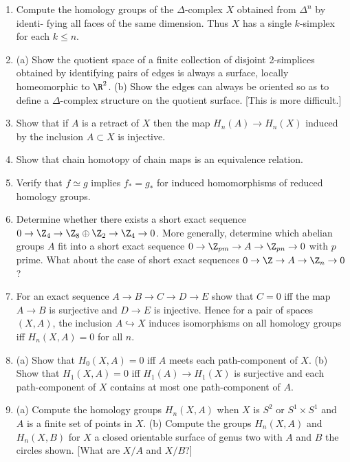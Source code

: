 \begin{enumerate}
\item Compute the homology groups of the $\Delta$-complex $X$ obtained from $\Delta^n$ by identi-
fying all faces of the same dimension. Thus $X$ has a single $k$-simplex for each $k \le n$.

\item (a) Show the quotient space of a finite collection of disjoint 2-simplices obtained
by identifying pairs of edges is always a surface, locally homeomorphic to $\R^2$.
(b) Show the edges can always be oriented so as to define a $\Delta$-complex structure on
the quotient surface. [This is more difficult.]

\item Show that if $A$ is a retract of $X$ then the map $H_n(A) \to H_n(X)$ induced by the
inclusion $A \subset X$ is injective.

\item Show that chain homotopy of chain maps is an equivalence relation.

\item Verify that $f \simeq g$ implies $f_* = g_*$ for induced homomorphisms of reduced
homology groups.

\item Determine whether there exists a short exact sequence $0 \to \Z_4 \to \Z_8 \oplus \Z_2 \to \Z_4 \to 0$.
More generally, determine which abelian groups $A$ fit into a short exact sequence
$0 \to \Z_{pm} \to A \to \Z_{pn} \to 0$ with $p$ prime. What about the case of short exact sequences
$0 \to \Z \to A \to \Z_n \to 0$?

\item For an exact sequence $A \to B \to C \to D \to E$ show that $C = 0$ iff the map $A \to B$
is surjective and $D \to E$ is injective. Hence for a pair of spaces $(X, A)$, the inclusion
$A \hookrightarrow X$ induces isomorphisms on all homology groups iff $H_n(X, A) = 0$ for all $n$.

\item (a) Show that $H_0(X, A) = 0$ iff $A$ meets each path-component of $X$.
(b) Show that $H_1(X, A) = 0$ iff $H_1(A) \to H_1(X)$ is surjective and each path-component
of $X$ contains at most one path-component of $A$.

\item (a) Compute the homology groups $H_n(X, A)$ when $X$ is $S^2$ or $S^1 \times S^1$ and $A$ is a
finite set of points in $X$.
(b) Compute the groups $H_n(X, A)$ and $H_n(X, B)$ for $X$
a closed orientable surface of genus two with $A$ and $B$
the circles shown. [What are $X/A$ and $X/B$?]


\end{enumerate}
